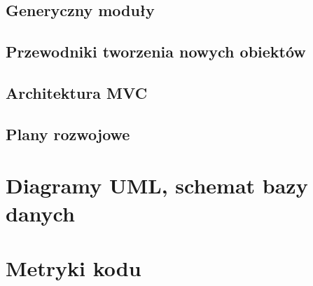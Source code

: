	\subsection{Generyczny moduły} 								
	\pagebreak	
	\subsection{Przewodniki tworzenia nowych obiektów} 		
	\pagebreak	
	\subsection{Architektura MVC} 								
	\pagebreak	
	\subsection{Plany rozwojowe}								
		
\section{Diagramy UML, schemat bazy danych}  							
\section{Metryki kodu}											